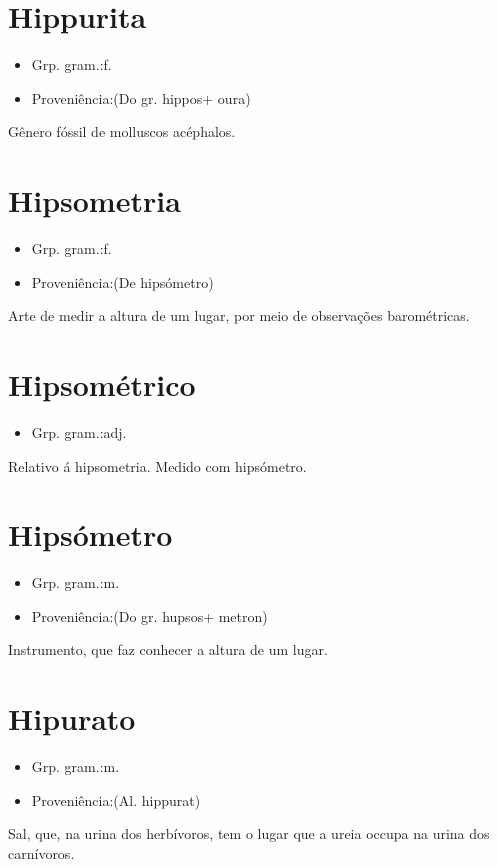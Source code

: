 \documentclass{article}
\begin{document}
\section{Hippurita}
\begin{itemize}
\item {Grp. gram.:f.}
\end{itemize}
\begin{itemize}
\item {Proveniência:(Do gr. \textunderscore hippos\textunderscore  + \textunderscore oura\textunderscore )}
\end{itemize}
Gênero fóssil de molluscos acéphalos.
\section{Hipsometria}
\begin{itemize}
\item {Grp. gram.:f.}
\end{itemize}
\begin{itemize}
\item {Proveniência:(De \textunderscore hipsómetro\textunderscore )}
\end{itemize}
Arte de medir a altura de um lugar, por meio de observações barométricas.
\section{Hipsométrico}
\begin{itemize}
\item {Grp. gram.:adj.}
\end{itemize}
Relativo á hipsometria.
Medido com hipsómetro.
\section{Hipsómetro}
\begin{itemize}
\item {Grp. gram.:m.}
\end{itemize}
\begin{itemize}
\item {Proveniência:(Do gr. \textunderscore hupsos\textunderscore  + \textunderscore metron\textunderscore )}
\end{itemize}
Instrumento, que faz conhecer a altura de um lugar.
\section{Hipurato}
\begin{itemize}
\item {Grp. gram.:m.}
\end{itemize}
\begin{itemize}
\item {Proveniência:(Al. \textunderscore hippurat\textunderscore )}
\end{itemize}
Sal, que, na urina dos herbívoros, tem o lugar que a ureia occupa na urina dos carnívoros.
\end{document}
